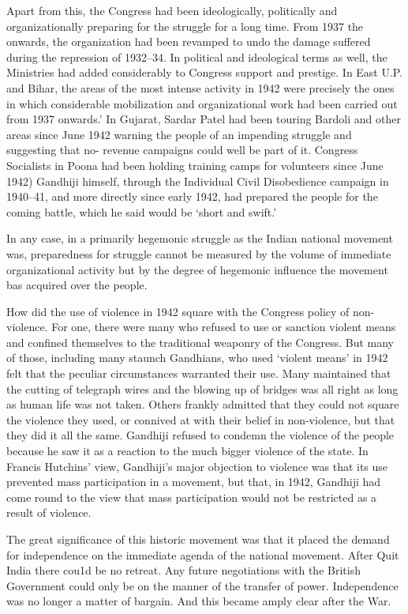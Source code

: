 \begin{multicols}{2}
Apart from this, the Congress had been ideologically, politically and organizationally preparing for the struggle for a long time. From 1937 the onwards, the organization had been revamped to undo the damage suffered during the repression of 1932--34. In political and ideological terms as well, the Ministries had added considerably to Congress support and prestige. In East U.P. and Bihar, the areas of the most intense activity in 1942 were precisely the ones in which considerable mobilization and organizational work had been carried out from 1937 onwards.' In Gujarat, Sardar Patel had been touring Bardoli and other areas since June 1942 warning the people of an impending struggle and suggesting that no- revenue campaigns could well be part of it. Congress Socialists in Poona had been holding training camps for volunteers since June 1942) Gandhiji himself, through the Individual Civil Disobedience campaign in 1940--41, and more directly since early 1942, had prepared the people for the coming battle, which he said would be `short and swift.'

In any case, in a primarily hegemonic struggle as the Indian national movement was, preparedness for struggle cannot be measured by the volume of immediate organizational activity but by the degree of hegemonic influence the movement bas acquired over the people.

How did the use of violence in 1942 square with the Congress policy of non-violence. For one, there were many who refused to use or sanction violent means and confined themselves to the traditional weaponry of the Congress. But many of those, including many staunch Gandhians, who used `violent means' in 1942 felt that the peculiar circumstances warranted their use. Many maintained that the cutting of telegraph wires and the blowing up of bridges was all right as long as human life was not taken. Others frankly admitted that they could not square the violence they used, or connived at with their belief in non-violence, but that they did it all the same. Gandhiji refused to condemn the violence of the people because he saw it as a reaction to the much bigger violence of the state. In Francis Hutchins' view, Gandhiji's major objection to violence was that its use prevented mass participation in a movement, but that, in 1942, Gandhiji had come round to the view that mass participation would not be restricted as a result of violence.

The great significance of this historic movement was that it placed the demand for independence on the immediate agenda of the national movement. After Quit India there cou1d be no retreat. Any future negotiations with the British Government could only be on the manner of the transfer of power. Independence was no longer a matter of bargain. And this became amply clear after the War.


\end{multicols}
